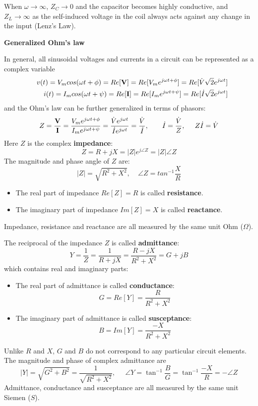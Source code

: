 When $\omega\rightarrow \infty$, $Z_C\rightarrow 0$ and the capacitor 
becomes highly conductive, and $Z_L\rightarrow \infty$ as the self-induced
voltage in the coil always acts against any change in the input (Lenz's Law).

{\bf Generalized Ohm's law}

In general, all sinusoidal voltages and currents in a circuit can be 
represented as a complex variable 
\begin{eqnarray}
&&v(t)=V_m cos(\omega t+\phi)=Re[{\bf V}]=Re[V_m e^{j\omega t+\phi}]
	=Re[\dot{V} \sqrt{2} e^{j\omega t}] 
	\nonumber \\
&&i(t)=I_m cos(\omega t+\psi)=Re[{\bf I}]=Re[I_m e^{j\omega t+\psi}]
	=Re[\dot{I} \sqrt{2} e^{j\omega t}] 
	\nonumber
\end{eqnarray}
and the Ohm's law can be further generalized in terms of phasors:
\[	Z=\frac{{\bf V}}{{\bf I}}=\frac{V_m e^{j\omega t+\phi}}
{I_m e^{j\omega t+\psi}}=\frac{\dot{V}e^{j\omega t}}{\dot{I}e^{j\omega t}}
=\frac{\dot{V}}{\dot{I}},\;\;\;\;\;\;\;
	\dot{I}=\frac{\dot{V}}{Z},\;\;\;\;\;Z\dot{I}=\dot{V}	\]
Here $Z$ is the complex {\bf impedance}:
\[	Z=R+jX=|Z|e^{j\angle Z}=|Z|\angle Z	\]
The magnitude and phase angle of $Z$ are:
\[	|Z|=\sqrt{R^2+X^2},\;\;\;\;\angle Z=tan^{-1}\frac{X}{R}	\]
\begin{itemize}
\item The real part of impedance $Re[Z]=R$ is called {\bf resistance}. 
\item The imaginary part of impedance  $Im[Z]=X$ is called {\bf reactance}. 
\end{itemize}
Impedance, resistance and reactance are all measured by the same unit 
Ohm ($\Omega$). 

The reciprocal of the impedance $Z$ is called {\bf admittance}:
\[	Y=\frac{1}{Z}=\frac{1}{R+jX}=\frac{R-jX}{R^2+X^2}=G+jB	\]
which contains real and imaginary parts:
\begin{itemize}
\item The real part of admittance is called {\bf conductance}:
\[	G=Re[Y]=\frac{R}{R^2+X^2}	\]
\item The imaginary part of admittance is called {\bf susceptance}:
\[	B=Im[Y]=\frac{-X}{R^2+X^2}	\]
\end{itemize}
Unlike $R$ and $X$, $G$ and $B$ do not correspond to any particular
circuit elements. The magnitude and phase of complex admittance are
\[	|Y|=\sqrt{G^2+B^2}=\frac{1}{\sqrt{R^2+X^2}},\;\;\;\;\;
	\angle Y=\tan^{-1} \frac{B}{G}=\tan^{-1} \frac{-X}{R}
	=-\angle Z	\]
Admittance, conductance and susceptance are all measured by the same 
unit Siemen ($S$). 

